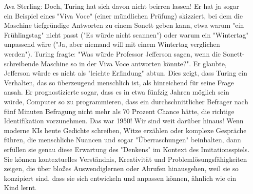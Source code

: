 \documentclass[a4paper,12pt]{scrartcl}
\begin{document}
Ava Sterling: Doch, Turing hat sich davon nicht beirren lassen! Er hat ja sogar ein Beispiel eines "Viva Voce" (einer mündlichen Prüfung) skizziert, bei dem die Maschine tiefgründige Antworten zu einem Sonett geben kann, etwa warum "ein Frühlingstag" nicht passt ("Es würde nicht scannen") oder warum ein "Wintertag" unpassend wäre ("Ja, aber niemand will mit einem Wintertag verglichen werden"). Turing fragte: "Was würde Professor Jefferson sagen, wenn die Sonett-schreibende Maschine so in der Viva Voce antworten könnte?". Er glaubte, Jefferson würde es nicht als "leichte Erfindung" abtun. Dies zeigt, dass Turing ein Verhalten, das so überzeugend menschlich ist, als hinreichend für seine Frage ansah. Er prognostizierte sogar, dass es in etwa fünfzig Jahren möglich sein würde, Computer so zu programmieren, dass ein durchschnittlicher Befrager nach fünf Minuten Befragung nicht mehr als 70 Prozent Chance hätte, die richtige Identifikation vorzunehmen. Das war 1950! Wir sind weit darüber hinaus! Wenn moderne KIs heute Gedichte schreiben, Witze erzählen oder komplexe Gespräche führen, die menschliche Nuancen und sogar "Überraschungen" beinhalten, dann erfüllen sie genau diese Erwartung des "Denkens" im Kontext des Imitationsspiels. Sie können kontextuelles Verständnis, Kreativität und Problemlösungsfähigkeiten zeigen, die über bloßes Auswendiglernen oder Abrufen hinausgehen, weil sie so konzipiert sind, dass sie sich entwickeln und anpassen können, ähnlich wie ein Kind lernt.\\
\end{document}
